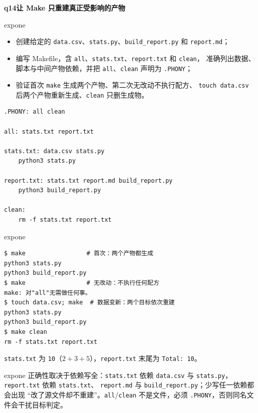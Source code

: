 \documentclass[11pt,a4paper,fontset=none]{ctexart}
\newcommand{\hwbanner}[3]{%
  \par\vspace{1.1em}
  \begin{tcolorbox}[enhanced, colback=#1!8, colframe=#1!75!black,
    boxrule=0.8pt, arc=2pt, left=7pt, right=7pt, top=4pt, bottom=4pt,
    before skip=1.1em]
    {\bfseries\color{#1!75!black}#2\qquad #3}
  \end{tcolorbox}
  \par\vspace{0.1em}\noindent\ignorespaces
}
\newcommand{\sublabel}[2]{%
  \par\vspace{0.8em}\noindent{\bfseries\color{#1!75!black}#2}\par\nobreak\vspace{0.25em}\noindent\ignorespaces
}
\begin{document}
\hwbanner{expone}{q14}{让 Make 只重建真正受影响的产物}
\begin{reqbox}{expone}
\begin{itemize}[leftmargin=1.4em, itemsep=1pt]
  \item 创建给定的 \texttt{data.csv}、\texttt{stats.py}、\texttt{build\_report.py} 和 \texttt{report.md}；
  \item 编写 Makefile，含 \texttt{all}、\texttt{stats.txt}、\texttt{report.txt} 和 \texttt{clean}，
        准确列出数据、脚本与中间产物依赖，并把 \texttt{all}、\texttt{clean} 声明为 \texttt{.PHONY}；
  \item 验证首次 \texttt{make} 生成两个产物、第二次无改动不执行配方、
        \texttt{touch data.csv} 后两个产物重新生成、\texttt{clean} 只删生成物。
\end{itemize}
\end{reqbox}
\sublabel{expone}{\faCode\ Makefile（\texttt{q14/Makefile}）}
\begin{lstlisting}[style=shell]
.PHONY: all clean

all: stats.txt report.txt

stats.txt: data.csv stats.py
	python3 stats.py

report.txt: stats.txt report.md build_report.py
	python3 build_report.py

clean:
	rm -f stats.txt report.txt
\end{lstlisting}
\begin{resbox}{expone}
\begin{lstlisting}[style=output]
$ make                 # 首次：两个产物都生成
python3 stats.py
python3 build_report.py
$ make                 # 无改动：不执行任何配方
make: 对"all"无需做任何事。
$ touch data.csv; make  # 数据变新：两个目标依次重建
python3 stats.py
python3 build_report.py
$ make clean
rm -f stats.txt report.txt
\end{lstlisting}
\texttt{stats.txt} 为 \texttt{10}（$2+3+5$），\texttt{report.txt} 末尾为
\texttt{Total: 10}。
\end{resbox}
\begin{trapbox}{expone}
  正确性取决于依赖写全：\texttt{stats.txt} 依赖 \texttt{data.csv} 与
  \texttt{stats.py}，\texttt{report.txt} 依赖 \texttt{stats.txt}、
  \texttt{report.md} 与 \texttt{build\_report.py}；少写任一依赖都会出现
  “改了源文件却不重建”。\texttt{all}/\texttt{clean} 不是文件，必须
  \texttt{.PHONY}，否则同名文件会干扰目标判定。
\end{trapbox}
\end{document}
